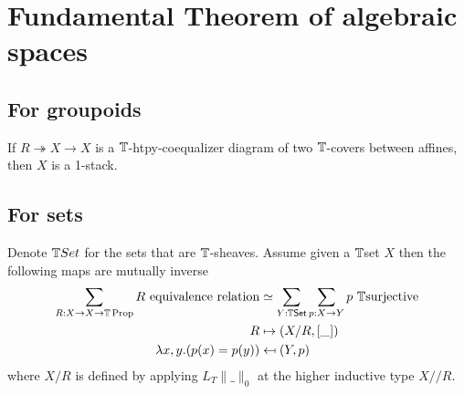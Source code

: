 \section{Fundamental Theorem of algebraic spaces}
\subsection{For groupoids}
\begin{lemma}
	If $R \twoheadrightarrow X \to X$ is a $\mathbb{T}$-htpy-coequalizer diagram of two $\mathbb{T}$-covers between affines, then $X$ is a  1-stack.
\end{lemma}

\subsection{For sets}
\begin{lemma}{\label{quotient-by-equivalence-relation}}
	Denote $\mathbb{T} Set$ for the sets that are $\mathbb{T}$-sheaves. Assume given a $\mathbb{T}$set  $X$ then the following maps are mutually inverse
	\begin{align*}
		\sum_{R:X\to X\to \bT\Prop} R\ \mathrm{equivalence\ relation} &\simeq \sum_{Y:\bT \mathrm{\Set}} \sum_{p:X\to Y} p\ \bT\mathrm{surjective} \\
		R &\mapsto (X/R,[\_]) \\
		\lambda x,y.  (p(x)=p(y)) &\mapsfrom (Y,p) 
	\end{align*}
	where $X / R$ is defined by applying $L_T \| \_ \|_0 $ at the higher inductive type $X // R$.
\end{lemma}

